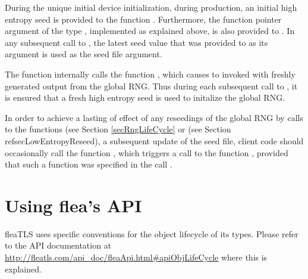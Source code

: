 \documentclass[a4paper,11pt]{scrartcl}
\begin{document}
During the unique initial device initialization, \eg
during production, an initial high entropy seed is provided to the
function \funcLibInit. Furthermore, the function pointer argument of the type
\funcSaveRngState, implemented as explained above, is also provided to
\funcLibInit. In any subsequent call to \funcLibInit, the latest seed value that was
provided to \funcSaveRngState as its argument is used as the seed file argument.

The function \funcLibInit internally calls the function
, which causes \funcSaveRngState to
invoked with freshly generated output from the global RNG. Thus during each
subsequent call to \funcLibInit, it is ensured that a fresh high entropy seed is
used to initalize the global RNG.

In order to achieve a lasting of effect of any reseedings of the global RNG
by calls to the functions   (see
Section \ref{secRngLifeCycle} or
 (see Section
ref{secLowEntropyReseed}), \ie a subsequent update of the seed file, client code
should occasionally call the function
, which triggers a call to the
function \funcSaveRngState, provided that such a function was specified in the
call \funcLibInit.

\section{Using flea's API}

fleaTLS uses specific conventions for the object lifecycle of its types. Please
refer to the API documentation at
\url{http://fleatls.com/api_doc/fleaApi.html#apiObjLifeCycle} where this is
explained.
\end{document}
